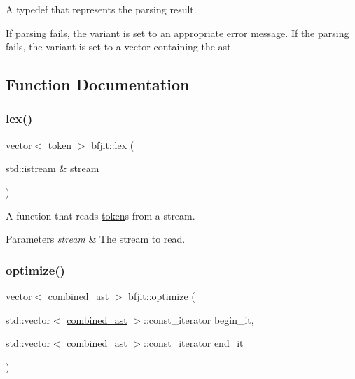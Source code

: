 A typedef that represents the parsing result. 

If parsing fails, the variant is set to an appropriate error message. If the parsing fails, the variant is set to a vector containing the ast. 

\subsection{Function Documentation}
\hypertarget{namespacebfjit_afc8d63bb8e810f0a8386783924340045}{}\label{namespacebfjit_afc8d63bb8e810f0a8386783924340045} 
\subsubsection{\texorpdfstring{lex()}{lex()}}
{\footnotesize\ttfamily vector$<$ \hyperlink{classbfjit_1_1token}{token} $>$ bfjit\+::lex (\begin{DoxyParamCaption}\item[{std\+::istream \&}]{stream }\end{DoxyParamCaption})}



A function that reads \hyperlink{classbfjit_1_1token}{token}s from a stream. 


\begin{DoxyParams}{Parameters}
{\em stream} & The stream to read. \\
\hline
\end{DoxyParams}
\hypertarget{namespacebfjit_a6d6a3107cfe22399215c398dd5d25d85}{}\label{namespacebfjit_a6d6a3107cfe22399215c398dd5d25d85} 
\subsubsection{\texorpdfstring{optimize()}{optimize()}}
{\footnotesize\ttfamily vector$<$ \hyperlink{namespacebfjit_ad9bbdb76861e57928b1bc7695c2c0623}{combined\+\_\+ast} $>$ bfjit\+::optimize (\begin{DoxyParamCaption}\item[{std\+::vector$<$ \hyperlink{namespacebfjit_ad9bbdb76861e57928b1bc7695c2c0623}{combined\+\_\+ast} $>$\+::const\+\_\+iterator}]{begin\+\_\+it,  }\item[{std\+::vector$<$ \hyperlink{namespacebfjit_ad9bbdb76861e57928b1bc7695c2c0623}{combined\+\_\+ast} $>$\+::const\+\_\+iterator}]{end\+\_\+it }\end{DoxyParamCaption})}



